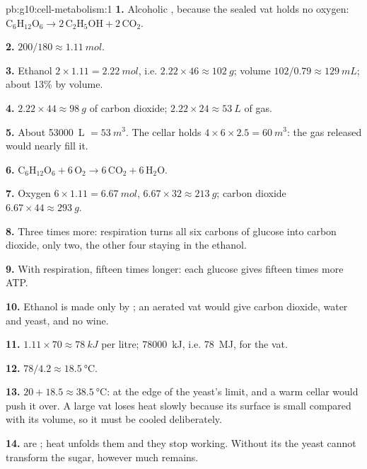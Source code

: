 \begin{solution}{pb:g10:cell-metabolism:1}
\textbf{1.} Alcoholic , because the sealed vat holds no
oxygen: $\mathrm{C_6H_{12}O_6} \to 2\,\mathrm{C_2H_5OH} +
2\,\mathrm{CO_2}$.

\textbf{2.} $200/180 \approx \qty{1.11}{mol}$.

\textbf{3.} Ethanol $2 \times 1.11 = \qty{2.22}{mol}$, i.e. $2.22
\times 46 \approx \qty{102}{g}$; volume $102/0.79 \approx
\qty{129}{mL}$; about 13\% by volume.

\textbf{4.} $2.22 \times 44 \approx \qty{98}{g}$ of carbon dioxide;
$2.22 \times 24 \approx \qty{53}{L}$ of gas.

\textbf{5.} About \qty{53000}{L} $= \qty{53}{m^3}$. The cellar holds
$4 \times 6 \times 2.5 = \qty{60}{m^3}$: the gas released would nearly
fill it.

\textbf{6.} $\mathrm{C_6H_{12}O_6} + 6\,\mathrm{O_2} \to
6\,\mathrm{CO_2} + 6\,\mathrm{H_2O}$.

\textbf{7.} Oxygen $6 \times 1.11 = \qty{6.67}{mol}$, $6.67 \times 32
\approx \qty{213}{g}$; carbon dioxide $6.67 \times 44 \approx
\qty{293}{g}$.

\textbf{8.} Three times more: respiration turns all six carbons of
glucose into carbon dioxide,  only two, the other four
staying in the ethanol.

\textbf{9.} With respiration, fifteen times longer: each glucose gives
fifteen times more ATP.

\textbf{10.} Ethanol is made only by ; an aerated vat would
give carbon dioxide, water and yeast, and no wine.

\textbf{11.} $1.11 \times 70 \approx \qty{78}{kJ}$ per litre;
\qty{78000}{kJ}, i.e. \qty{78}{MJ}, for the vat.

\textbf{12.} $78/4.2 \approx \qty{18.5}{\celsius}$.

\textbf{13.} $20 + 18.5 \approx \qty{38.5}{\celsius}$: at the edge of
the yeast's limit, and a warm cellar would push it over. A large vat
loses heat slowly because its surface is small compared with its
volume, so it must be cooled deliberately.

\textbf{14.}  are ; heat unfolds them and they stop
working. Without its  the yeast cannot transform the sugar,
however much remains.


\end{solution}

